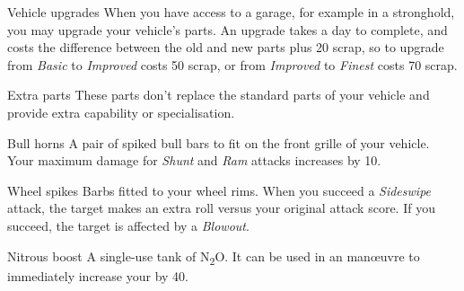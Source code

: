 \begin{abstractsection}{Vehicle upgrades}
  When you have access to a garage, for example in a stronghold, you may upgrade your vehicle's parts. An upgrade takes a day to complete, and costs the difference between the old and new parts plus 20 scrap, so to upgrade from \emph{Basic} to \emph{Improved} costs 50 scrap, or from \emph{Improved} to \emph{Finest} costs 70 scrap.
\end{abstractsection}

\begin{abstractsection}{Extra parts}
These parts don't replace the standard parts of your vehicle and provide extra capability or specialisation.

\begin{describe}{Bull horns}
  A pair of spiked bull bars to fit on the front grille of your vehicle. Your maximum damage for \emph{Shunt} and \emph{Ram} attacks increases by 10.
\end{describe}

\begin{describe}{Wheel spikes}
  Barbs fitted to your wheel rims. When you succeed a \emph{Sideswipe} attack, the target makes an extra  roll versus your original attack score. If you succeed, the target is affected by a \emph{Blowout}.
\end{describe}

\begin{describe}{Nitrous boost}
  A single-use tank of N\textsubscript{2}O. It can be used in an  man\oe{}uvre to immediately increase your  by 40.
\end{describe}

\end{abstractsection}
